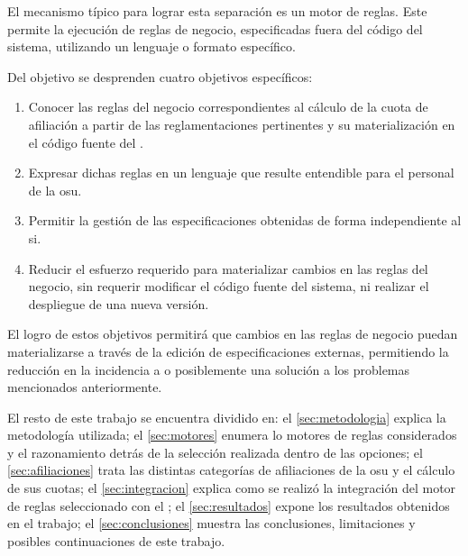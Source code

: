 El mecanismo típico para lograr esta separación es un motor de reglas. 
Este permite la ejecución de reglas de negocio, especificadas fuera del código del sistema, utilizando un lenguaje o formato específico.


Del objetivo se desprenden cuatro objetivos específicos:
\begin{enumerate}
    \item \label{obj:esp:extraer}
    Conocer las reglas del negocio correspondientes al cálculo de la cuota de afiliación a partir de las reglamentaciones pertinentes y su materialización en el código fuente del {\SIDOSPU}.
    \item \label{obj:esp:intelegible}
    Expresar dichas reglas en un lenguaje que resulte entendible para el personal de la \acrlong{osu}.
    \item \label{obj:esp:independiente}
    Permitir la gestión de las especificaciones obtenidas de forma independiente al \acrshort{si}.
    \item \label{obj:esp:esfuerzo}
    Reducir el esfuerzo requerido para materializar cambios en las reglas del negocio, sin requerir modificar el código fuente del sistema, ni realizar el despliegue de una nueva versión.
\end{enumerate}

El logro de estos objetivos permitirá que cambios en las reglas de negocio puedan materializarse a través de la edición de especificaciones externas,  permitiendo la reducción en la incidencia a o posiblemente una solución a los problemas mencionados anteriormente.




El resto de este trabajo se encuentra dividido en:
el \cref{sec:metodologia} explica la metodología utilizada; 
el \cref{sec:motores} enumera lo motores de reglas considerados y el razonamiento detrás de la selección realizada dentro de las opciones;
el \cref{sec:afiliaciones} trata las distintas categorías de afiliaciones de la \acrshort{osu} y el cálculo de sus cuotas;
el \cref{sec:integracion} explica como se realizó la integración del motor de reglas seleccionado con el {\SIOSU};
el \cref{sec:resultados} expone los resultados obtenidos en el trabajo;
el \cref{sec:conclusiones} muestra las conclusiones, limitaciones y posibles continuaciones de este trabajo.